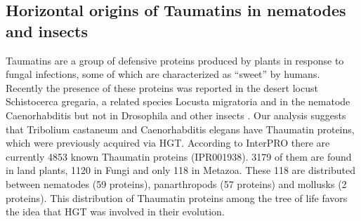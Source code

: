 \subsection{Horizontal origins of Taumatins in nematodes and insects}
Taumatins are a group of defensive proteins produced by plants in response to
fungal infections, some of which are characterized as “sweet” by humans.
Recently the presence of these proteins was reported in the desert locust
Schistocerca gregaria, a related species Locusta migratoria and in the nematode
Caenorhabditis but not in Drosophila and other insects \cite{Brandazza2004}. Our analysis
suggests that Tribolium castaneum and Caenorhabditis elegans have Thaumatin
proteins, which were previously acquired via HGT.  According to InterPRO
\cite{Finn2017}
there are currently 4853 known Thaumatin proteins (IPR001938). 3179 of them are
found in land plants, 1120 in Fungi and only 118 in Metazoa. These 118 are
distributed between nematodes (59 proteins), panarthropods (57 proteins) and
mollusks (2 proteins). This distribution of Thaumatin proteins among the tree
of life favors the idea that HGT was involved in their evolution.

